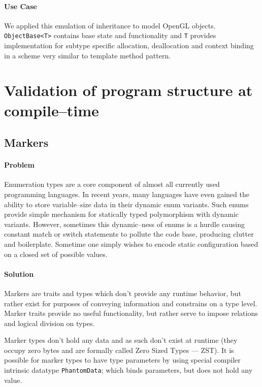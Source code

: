 \paragraph{Use Case}

We applied this emulation of inheritance to model OpenGL objects. \texttt{ObjectBase<T>} contains base state and functionality and \texttt{T} provides implementation 
for subtype specific allocation, deallocation and context binding in a scheme very similar to template method pattern.

\section{Validation of program structure at compile--time}

\subsection{Markers}

\paragraph{Problem}

Enumeration types are a core component of almost all currently used programming languages. In recent years, many languages have even gained the ability to store variable--size data in their dynamic enum variants.
Such enums provide simple mechanism for statically typed polymorphism with dynamic variants. 
However, sometimes this dynamic--ness of enums is a hurdle causing constant match or switch statements to pollute the code base, producing clutter and boilerplate.
Sometime one simply wishes to encode static configuration based on a closed set of possible values.

\paragraph{Solution}

Markers are traits and types which don't provide any runtime behavior, but rather exist for purposes of conveying information and constrains on a type level.
Marker traits provide no useful functionality, but rather serve to impose relations and logical division on types.

Marker types don't hold any data and as such don't exist at runtime (they occupy zero bytes and are formally called Zero Sized Types --- ZST).
It is possible for marker types to have type parameters by using special compiler intrinsic datatype \texttt{PhantomData}; which binds parameters, but does not hold any value.

